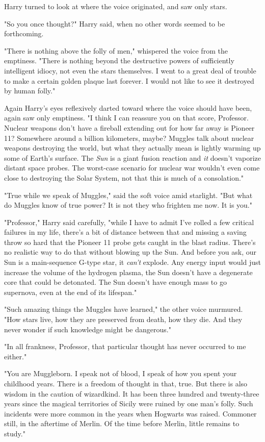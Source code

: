 Harry turned to look at where the voice originated, and saw only stars.

"So you once thought?" Harry said, when no other words seemed to be forthcoming.

"There is nothing above the folly of men," whispered the voice from the
emptiness. "There is nothing beyond the destructive powers of sufficiently
intelligent idiocy, not even the stars themselves. I went to a great deal of
trouble to make a certain golden plaque last forever. I would not like to see
it destroyed by human folly."

Again Harry's eyes reflexively darted toward where the voice should have been,
again saw only emptiness. "I think I can reassure you on that score, Professor.
Nuclear weapons don't have a fireball extending out for{\el} how far away is
Pioneer 11? Somewhere around a billion kilometers, maybe? Muggles talk about
nuclear weapons destroying the world, but what they actually mean is lightly
warming up some of Earth's surface. The \emph{Sun} is a giant fusion reaction
and \emph{it} doesn't vaporize distant space probes. The worst-case scenario
for nuclear war wouldn't even come close to destroying the Solar System, not
that this is much of a consolation."

"True while we speak of Muggles," said the soft voice amid starlight. "But what
do Muggles know of true power? It is not they who frighten me now. It is you."

"Professor," Harry said carefully, "while I have to admit I've rolled a few
critical failures in my life, there's a bit of distance between that and
missing a saving throw so hard that the Pioneer 11 probe gets caught in the
blast radius. There's no realistic way to do that without blowing up the Sun.
And before you ask, our Sun is a main-sequence G-type star, it \emph{can't}
explode. Any energy input would just increase the volume of the hydrogen
plasma, the Sun doesn't have a degenerate core that could be detonated. The Sun
doesn't have enough mass to go supernova, even at the end of its lifespan."

"Such amazing things the Muggles have learned," the other voice murmured. "How
stars live, how they are preserved from death, how they die. And they never
wonder if such knowledge might be dangerous."

"In all frankness, Professor, that particular thought has never occurred to me
either."

"You are Muggleborn. I speak not of blood, I speak of how you spent your
childhood years. There is a freedom of thought in that, true. But there is also
wisdom in the caution of wizardkind. It has been three hundred and twenty-three
years since the magical territories of Sicily were ruined by one man's folly.
Such incidents were more common in the years when Hogwarts was raised. Commoner
still, in the aftertime of Merlin. Of the time before Merlin, little remains to
study."

